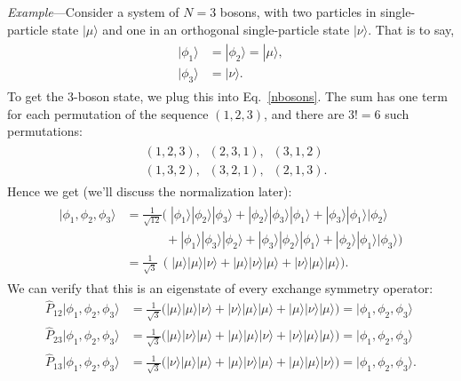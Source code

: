 \documentclass[prx,12pt]{revtex4-2}
\begin{document}
\begin{framed}
\noindent
\textit{Example}---Consider a system of $N = 3$ bosons, with two
particles in single-particle state $|\mu\rangle$ and one in an
orthogonal single-particle state $|\nu\rangle$.  That is to say,
\begin{align}
  \begin{aligned}
    |\phi_1\rangle &= |\phi_2\rangle = |\mu\rangle, \\
    |\phi_3\rangle &= |\nu\rangle.
  \end{aligned}
\end{align}
To get the 3-boson state, we plug this into Eq.~\eqref{nbosons}.  The
sum has one term for each permutation of the sequence $(1,2,3)$, and
there are $3! = 6$ such permutations:
\begin{align}
  \begin{aligned}
    &(1,2,3), \;\; (2,3,1), \;\;(3,1,2) \\
    &(1,3,2), \;\; (3,2,1), \;\;(2,1,3).
  \end{aligned}
\end{align}
Hence we get (we'll discuss the normalization later):
\begin{align}
  \begin{aligned}
    |\phi_1,\phi_2,\phi_3\rangle &= \frac{1}{\sqrt{12}} \Big( \;
    |\phi_1\rangle|\phi_2\rangle|\phi_3\rangle +
    |\phi_2\rangle|\phi_3\rangle|\phi_1\rangle +
    |\phi_3\rangle|\phi_1\rangle|\phi_2\rangle \\
    &\qquad\quad\, +
    |\phi_1\rangle|\phi_3\rangle|\phi_2\rangle +
    |\phi_3\rangle|\phi_2\rangle|\phi_1\rangle +
    |\phi_2\rangle|\phi_1\rangle|\phi_3\rangle\Big) \\
    &= \frac{1}{\sqrt{3}} \;\, \Big(\;
    |\mu\rangle|\mu\rangle|\nu\rangle +
    |\mu\rangle|\nu\rangle|\mu\rangle +
    |\nu\rangle|\mu\rangle|\mu\rangle\Big).
  \end{aligned}
\end{align}
We can verify that this is an eigenstate of every exchange symmetry
operator:
\begin{align}
  \hat{P}_{12}|\phi_1,\phi_2,\phi_3\rangle
    &= \frac{1}{\sqrt{3}} \Big(
  |\mu\rangle|\mu\rangle|\nu\rangle +
  |\nu\rangle|\mu\rangle|\mu\rangle +
  |\mu\rangle|\nu\rangle|\mu\rangle\Big)
  = |\phi_1,\phi_2,\phi_3\rangle \label{3bosonex1} \\
  \hat{P}_{23}|\phi_1,\phi_2,\phi_3\rangle
  &= \frac{1}{\sqrt{3}} \Big(
  |\mu\rangle|\nu\rangle|\mu\rangle +
  |\mu\rangle|\mu\rangle|\nu\rangle +
  |\nu\rangle|\mu\rangle|\mu\rangle\Big)
  = |\phi_1,\phi_2,\phi_3\rangle\\
  \hat{P}_{13}|\phi_1,\phi_2,\phi_3\rangle
  &= \frac{1}{\sqrt{3}} \Big(
  |\nu\rangle|\mu\rangle|\mu\rangle +
  |\mu\rangle|\nu\rangle|\mu\rangle +
  |\mu\rangle|\mu\rangle|\nu\rangle\Big)
  = |\phi_1,\phi_2,\phi_3\rangle. \label{3bosonex3}
\end{align}
\end{framed}
\end{document}
